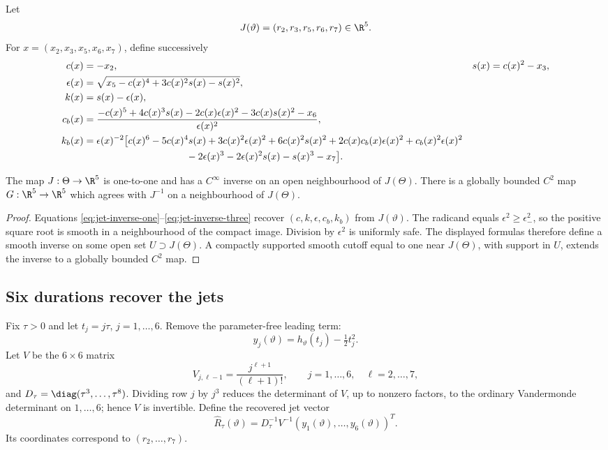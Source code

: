 Let
\[
 J(\vartheta)=(r_2,r_3,r_5,r_6,r_7)\in\R^5.
\]
For \(x=(x_2,x_3,x_5,x_6,x_7)\), define successively
\begin{align}
 c(x)&=-x_2, & s(x)&=c(x)^2-x_3,\notag\\
 \epsilon(x)&=\sqrt{x_5-c(x)^4+3c(x)^2s(x)-s(x)^2},
 \label{eq:jet-inverse-one}\\
 k(x)&=s(x)-\epsilon(x),\notag\\
 c_b(x)&=\frac{-c(x)^5+4c(x)^3s(x)-2c(x)\epsilon(x)^2
                -3c(x)s(x)^2-x_6}{\epsilon(x)^2},
 \label{eq:jet-inverse-two}\\
 k_b(x)&=\epsilon(x)^{-2}\bigl[c(x)^6-5c(x)^4s(x)
 +3c(x)^2\epsilon(x)^2+6c(x)^2s(x)^2
 +2c(x)c_b(x)\epsilon(x)^2+c_b(x)^2\epsilon(x)^2\notag\\
 &\hspace{37mm}-2\epsilon(x)^3-2\epsilon(x)^2s(x)-s(x)^3-x_7\bigr].
 \label{eq:jet-inverse-three}
\end{align}

\begin{lemma}
\label{lem:jet-inversion}
The map \(J:\Theta\to\R^5\) is one-to-one and has a \(C^\infty\) inverse on
an open neighbourhood of \(J(\Theta)\).  There is a globally bounded
\(C^2\) map \(G:\R^5\to\R^5\) which agrees with \(J^{-1}\) on a
neighbourhood of \(J(\Theta)\).
\end{lemma}

\begin{proof}
Equations \eqref{eq:jet-inverse-one}--\eqref{eq:jet-inverse-three} recover
\((c,k,\epsilon,c_b,k_b)\) from \(J(\vartheta)\).  The radicand equals
\(\epsilon^2\ge\epsilon_-^2\), so the positive square root is smooth in a
neighbourhood of the compact image.  Division by \(\epsilon^2\) is uniformly
safe.  The displayed formulas therefore define a smooth inverse on some open
set \(U\supset J(\Theta)\).  A compactly supported smooth cutoff equal to one
near \(J(\Theta)\), with support in \(U\), extends the inverse to a globally
bounded \(C^2\) map.
\end{proof}

\subsection{Six durations recover the jets}

Fix \(\tau>0\) and let \(t_j=j\tau\), \(j=1,\ldots,6\).  Remove the
parameter-free leading term:
\[
 y_j(\vartheta)=h_\vartheta(t_j)-\tfrac12t_j^2.
\]
Let \(V\) be the \(6\times6\) matrix
\[
 V_{j,\ell-1}=\frac{j^{\ell+1}}{(\ell+1)!},
 \qquad j=1,\ldots,6,\quad \ell=2,\ldots,7,
\]
and \(D_\tau=\diag(\tau^3,\ldots,\tau^8)\).  Dividing row \(j\) by
\(j^3\) reduces the determinant of \(V\), up to nonzero factors, to the
ordinary Vandermonde determinant on \(1,\ldots,6\); hence \(V\) is
invertible.  Define the recovered jet vector
\begin{equation}
 \widehat R_\tau(\vartheta)=D_\tau^{-1}V^{-1}
 (y_1(\vartheta),\ldots,y_6(\vartheta))^T.
 \label{eq:recovered-jets}
\end{equation}
Its coordinates correspond to \((r_2,\ldots,r_7)\).


